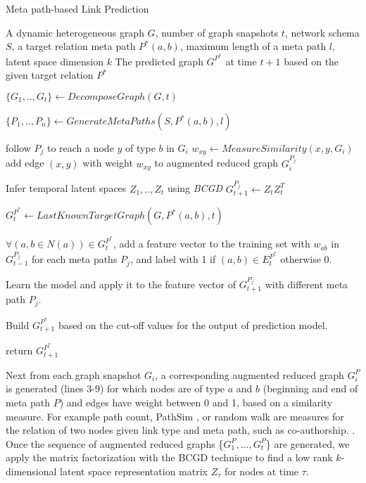 \begin{algorithm}[t]
\caption{Meta path-based Link Prediction}\label{alg2}
\begin{algorithmic}[1]\scriptsize
\REQUIRE A dynamic heterogeneous graph $G$, number of graph snapshots $t$, network schema $S$, a target relation meta path $P^*(a,b)$, maximum length of a meta path $l$, latent space dimension $k$
\ENSURE The predicted graph $G^{P^*}$ at time $t+1$ based on the given target relation $P^*$

\STATE $\{G_1, .., G_t\} \leftarrow DecomposeGraph(G, t)$

\STATE $\{P_1, .., P_n\} \leftarrow GenerateMetaPaths(S, P^*(a,b), l)$


    
        \STATE follow $P_j$ to reach a node $y$ of type $b$ in $G_i$ 
        \STATE $w_{xy} \leftarrow MeasureSimilarity(x,y, G_i)$
        \STATE add edge $(x,y)$ with weight $w_{xy}$ to augmented reduced graph $G_i^{P_j}$ 
\ENDFOR

\ENDFOR

\STATE Infer temporal latent spaces $Z_1, .., Z_t$ using \textit{BCGD}%
\STATE $G^{P_j}_{t+1} \leftarrow Z_tZ^T_t$ 

\ENDFOR

\STATE $G^{P^*}_{t} \leftarrow LastKnownTargetGraph(G, P^*(a,b), t)$


\STATE $\forall (a,b\in N(a)) \in G^{P^*}_{t}$, add a feature vector to the training set with $w_{ab}$ in $G^{P_j}_{t-1}$ for each meta paths $P_j$, and label with 1 if $(a,b) \in E^{P^*}_{t}$ otherwise 0.

\STATE Learn the model and apply it to the feature vector of $G^{P_j}_{t+1}$ with different meta path $P_j$.

\STATE Build $G^{P^*}_{t+1}$ based on the cut-off values for the output of prediction model.

\STATE return $G^{P^*}_{t+1}$
\end{algorithmic}
\end{algorithm}


 Next from each graph snapshot $G_i$, a corresponding augmented reduced graph $G^P_i$ is generated (lines 3-9) for which nodes are of type $a$ and $b$ (beginning and end of meta path $P$) and edges have weight between 0 and 1, based on a similarity measure. For example path count, PathSim \cite{sun2011pathsim}, or random walk are measures for the relation of two nodes given link type and meta path, such as co-authorship.
. Once the sequence of augmented reduced graphs \{$G^P_1, ..., G^P_t$\} are generated, we apply the matrix factorization with the BCGD technique \cite{Zhu2016} to find a low rank $k$-dimensional latent space representation matrix $Z_\tau$ for nodes at time $\tau$.

